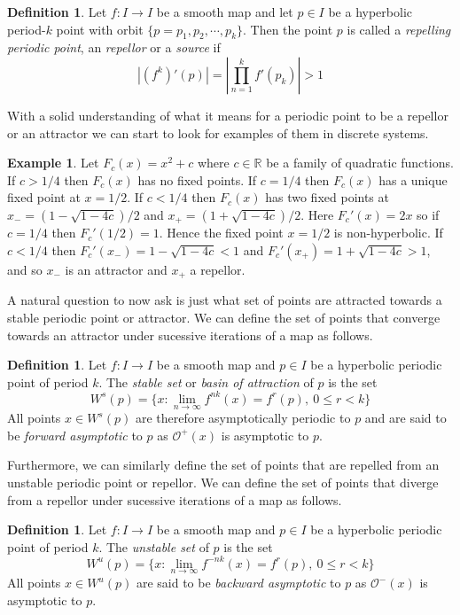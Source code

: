 \documentclass[11pt,a4paper,oneside]{memoir}
\theoremstyle{plain}
\theoremstyle{definition}
\newtheorem{defn}[thm]{Definition}
\newtheorem{exmp}[thm]{Example}
\begin{document}
\begin{defn} \label{def:repellor}
    Let $f: I \to I$ be a smooth map and let $p \in I$ be a hyperbolic period-$k$ point with orbit $\lbrace p = p_1, p_2, \cdots, p_k \rbrace$. Then the point $p$ is called a \emph{repelling periodic point}, an \emph{repellor} or a \emph{source} if \[|(f^k)'(p)| = \left\lvert \prod_{n = 1}^k f'(p_k) \right\rvert > 1\]
\end{defn}

With a solid understanding of what it means for a periodic point to be a repellor or an attractor we can start to look for examples of them in discrete systems.

\begin{exmp}
    Let $F_c(x) = x^2 + c$ where $c \in \mathbb{R}$ be a family of quadratic functions. If $c > 1/4$ then $F_c(x)$ has no fixed points. If $c = 1/4$ then $F_c(x)$ has a unique fixed point at $x = 1/2$. If $c < 1/4$ then $F_c(x)$ has two fixed points at $x_- = (1 - \sqrt{1 - 4c}) / 2$ and $x_+ = (1 + \sqrt{1 - 4c}) / 2$. Here $F_c'(x) = 2x$ so if $c = 1/4$ then $F_c'(1/2) = 1$. Hence the fixed point $x = 1/2$ is non-hyperbolic. If $c < 1/4$ then $F_c'(x_-) = 1 - \sqrt{1 - 4c} < 1$ and $F_c'(x_+) = 1 + \sqrt{1 - 4c} > 1$, and so $x_-$ is an attractor and $x_+$ a repellor.
\end{exmp}

A natural question to now ask is just what set of points are attracted towards a stable periodic point or attractor. We can define the set of points that converge towards an attractor under sucessive iterations of a map as follows.

\begin{defn}
    Let $f: I \to I$ be a smooth map and $p \in I$ be a hyperbolic periodic point of period $k$. The \emph{stable set} or \emph{basin of attraction} of $p$ is the set \[W^s(p) = \lbrace x : \lim_{n \to \infty} f^{nk}(x) = f^r(p), \ 0 \leq r < k \rbrace\] All points $x \in W^s(p)$ are therefore asymptotically periodic to $p$ and are said to be \emph{forward asymptotic} to $p$ as $\mathcal{O}^+(x)$ is asymptotic to $p$.
\end{defn}

Furthermore, we can similarly define the set of points that are repelled from an unstable periodic point or repellor. We can define the set of points that diverge from a repellor under sucessive iterations of a map as follows.

\begin{defn}
    Let $f: I \to I$ be a smooth map and $p \in I$ be a hyperbolic periodic point of period $k$. The \emph{unstable set} of $p$ is the set \[W^u(p) = \lbrace x : \lim_{n \to \infty} f^{-nk}(x) = f^r(p), \ 0 \leq r < k \rbrace\] All points $x \in W^u(p)$ are said to be \emph{backward asymptotic} to $p$ as $\mathcal{O}^-(x)$ is asymptotic to $p$.
\end{defn}
\end{document}

